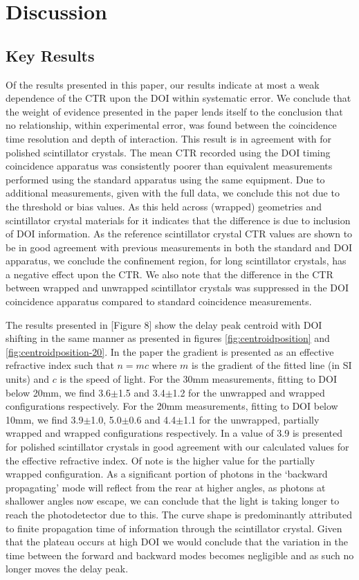 \section{Discussion}
\label{sec:discussion}
\subsection{Key Results}
Of the results presented in this paper, our results indicate at most a weak dependence of the CTR upon the DOI within systematic error. We conclude that the weight of evidence presented in the paper lends itself to the conclusion that no relationship, within experimental error, was found between the coincidence time resolution and depth of interaction. This result is in agreement with \cite{Bircher_Shao_2012} for polished scintillator crystals. The mean CTR recorded using the DOI timing coincidence apparatus was consistently poorer than equivalent measurements performed using the standard apparatus using the same equipment. Due to additional measurements, given with the full data, we conclude this not due to the threshold or bias values. As this held across (wrapped) geometries and scintillator crystal materials for it indicates that the difference is due to inclusion of DOI information. As the reference scintillator crystal CTR values are shown to be in good agreement with previous measurements in both the standard and DOI apparatus, we conclude the confinement region, for long scintillator crystals, has a negative effect upon the CTR. We also note that the difference in the CTR between wrapped and unwrapped scintillator crystals was suppressed in the DOI coincidence apparatus compared to standard coincidence measurements.

The results presented in [Figure 8]\cite{Moses_Derenzo_1999} show the delay peak centroid with DOI shifting in the same manner as presented in figures \ref{fig:centroidposition} and \ref{fig:centroidposition-20}. In the paper the gradient is presented as an effective refractive index such that $n=mc$ where $m$ is the gradient of the fitted line (in SI units) and $c$ is the speed of light. For the 30mm measurements, fitting to DOI below 20mm, we find 3.6$\pm$1.5 and 3.4$\pm$1.2 for the unwrapped and wrapped configurations respectively.  For the 20mm measurements, fitting to DOI below 10mm, we find 3.9$\pm$1.0, 5.0$\pm$0.6 and 4.4$\pm$1.1 for the unwrapped, partially wrapped and wrapped configurations respectively. In \cite{Moses_Derenzo_1999} a value of 3.9 is presented for polished scintillator crystals in good agreement with our calculated values for the effective refractive index. Of note is the higher value for the partially wrapped configuration. As a significant portion of photons in the `backward propagating' mode will reflect from the rear at higher angles, as photons at shallower angles now escape, we can conclude that the light is taking longer to reach the photodetector due to this. The curve shape is predominantly attributed to finite propagation time of information through the scintillator crystal. Given that the plateau occurs at high DOI we would conclude that the variation in the time between the forward and backward modes becomes negligible and as such no longer moves the delay peak.

